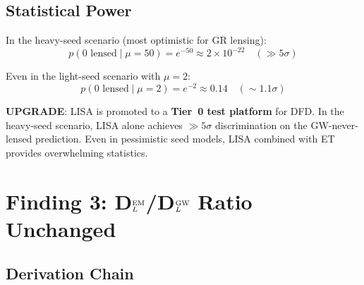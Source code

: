 \documentclass[11pt]{article}
\begin{document}
\subsection{Statistical Power}

In the heavy-seed scenario (most optimistic for GR lensing):
\begin{equation}
p(\text{0 lensed} \mid \mu = 50) = e^{-50} \approx 2 \times 10^{-22}
\quad (\gg 5\sigma)
\end{equation}

Even in the light-seed scenario with $\mu = 2$:
\begin{equation}
p(\text{0 lensed} \mid \mu = 2) = e^{-2} \approx 0.14
\quad (\sim 1.1\sigma)
\end{equation}

\begin{tcolorbox}[colback=blue!5!white, colframe=blue!70!black]
\textbf{UPGRADE}: LISA is promoted to a \textbf{Tier~0 test platform}
for DFD. In the heavy-seed scenario, LISA alone achieves $\gg 5\sigma$
discrimination on the GW-never-lensed prediction. Even in pessimistic
seed models, LISA combined with ET provides overwhelming statistics.
\end{tcolorbox}

\section{Finding 3: D$_L^{\rm EM}$/D$_L^{\rm GW}$ Ratio Unchanged}
\label{sec:dl-ratio}

\subsection{Derivation Chain}
\end{document}
